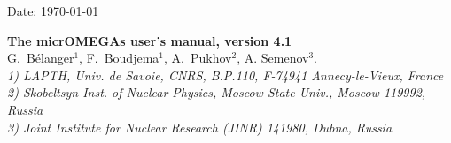 \documentclass[12pt,a4paper]{article}
\begin{document}
\def\micro{{\tt micrOMEGAs}}
\def\ra{\rightarrow}
\def\calchep{{\tt CalcHEP}}

\def\suspect{{\tt SuSpect}}
\def\mbmb{m_b(m_b)}
\def\mt{m_t}
\def\dMb{\Delta m_b}
\def\dMq{\Delta m_q}
\def\delrho{\Delta\rho}
\def\bsgamma{b\to s\gamma}
\def\bsmu{B_s\to \mu^+\mu^-}
\def\gmuon{(g-2)_\mu}
\def\noi{\noindent}
\def\VERSION{4.2}


\begin{flushright}
   \vspace*{-18mm}
   Date: \today
\end{flushright}
\vspace*{2mm}




\begin{center}


{\Large\bf The  micrOMEGAs user's manual, version 4.1} \\[8mm]

{\large   G.~B\'elanger$^1$, F.~Boudjema$^1$, A.~Pukhov$^2$,  A. Semenov$^3$.}\\[4mm]

{\it 1) LAPTH, Univ. de Savoie, CNRS, B.P.110,  F-74941 Annecy-le-Vieux, France\\
     2) Skobeltsyn Inst. of Nuclear Physics, Moscow State Univ., Moscow 119992, Russia\\
     3) Joint Institute for Nuclear Research (JINR) 141980, Dubna,  Russia\\}
\end{center}

\begin{abstract}
We give an up-to-date description of the micrOMEGAs functions. Only the routines which are available for
the users are described.  Examples on how to use these functions
can be found in the sample main programs distributed with the code. 
\end{abstract}



\tableofcontents

\newpage
\end{document}
